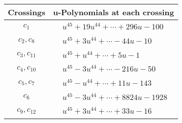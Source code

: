 \documentclass[1p]{elsarticle_modified}
\theoremstyle{definition}
\begin{document}
\begin{tabular}{m{50pt}|m{274pt}}
Crossings & \hspace{64pt}u-Polynomials at each crossing \\
\hline $$\begin{aligned}c_{1}\end{aligned}$$&$\begin{aligned}
&u^{45}+19 u^{44}+\cdots+296 u-100
\end{aligned}$\\
\hline $$\begin{aligned}c_{2},c_{8}\end{aligned}$$&$\begin{aligned}
&u^{45}+3 u^{44}+\cdots-44 u-10
\end{aligned}$\\
\hline $$\begin{aligned}c_{3},c_{11}\end{aligned}$$&$\begin{aligned}
&u^{45}+u^{44}+\cdots+5 u-1
\end{aligned}$\\
\hline $$\begin{aligned}c_{4},c_{10}\end{aligned}$$&$\begin{aligned}
&u^{45}-3 u^{44}+\cdots-216 u-50
\end{aligned}$\\
\hline $$\begin{aligned}c_{5},c_{7}\end{aligned}$$&$\begin{aligned}
&u^{45}- u^{44}+\cdots+11 u-143
\end{aligned}$\\
\hline $$\begin{aligned}c_{6}\end{aligned}$$&$\begin{aligned}
&u^{45}-3 u^{44}+\cdots+8824 u-1928
\end{aligned}$\\
\hline $$\begin{aligned}c_{9},c_{12}\end{aligned}$$&$\begin{aligned}
&u^{45}+3 u^{44}+\cdots+33 u-16
\end{aligned}$\\
\hline
\end{tabular}\\~\\
\newpage\renewcommand{\arraystretch}{1}
\end{document}
